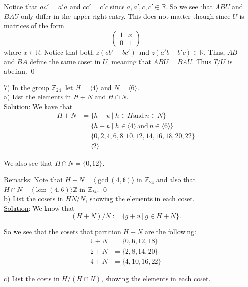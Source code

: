 \documentclass{article}
\DeclareMathOperator{\lcm}{lcm}
\begin{document}
Notice that $aa' = a'a$ and $cc' = c'c$ since $a, a', c, c' \in \mathbb{R}$. So we see that $ABU$ and $BAU$ only differ in the upper right entry. This does not matter though since $U$ is matrices of the form 
$$\begin{pmatrix}
1 & x \\
0 & 1
\end{pmatrix}$$ where $x \in \mathbb{R}$. Notice that both $z(ab' + bc')$ and $z(a'b + b'c) \in \mathbb{R}$. Thus, $AB$ and $BA$ define the same coset in $U$, meaning that $ABU = BAU$. Thus $T/U$ is abelian. \qed \pagebreak

7) In the group $\mathbb{Z}_{24}$, let $H = \langle 4 \rangle$ and $N = \langle 6 \rangle.$\\

a) List the elements in $H + N$ and $H \cap N$.\\

\underline{Solution}: We have that
\begin{align*}
	H+N &= \{ h + n \ \vert \ h \in H \text{and} \, n \in N\} \\
	&= \{ h + n \ \vert \ h \in \langle 4 \rangle \, \text{and} \, n \in \langle 6 \rangle\} \\
	&= \{ 0, 2, 4, 6, 8, 10, 12, 14, 16, 18, 20, 22 \} \\
	&= \langle 2 \rangle
\end{align*}

We also see that $H \cap N = \{ 0, 12 \}.$

Remarks: Note that $H + N = \big\langle \gcd(4,6) \big\rangle $ in $\mathbb{Z}_{24}$ and also that $H \cap N = \big\langle \lcm(4, 6) \big\rangle \mathbb{Z}$ in $\mathbb{Z}_{24}$. \qed \\

b) List the cosets in $HN/N$, showing the elements in each coset.\\

\underline{Solution}: We know that 
$$ (H + N) / N := \{ g + n \, \vert \, g \in H + N\}. $$

So we see that the cosets that partition $H+N$ are the following:
\begin{align*}
	0 + N &= \{ 0, 6, 12, 18\} \\
	2 + N &= \{ 2, 8, 14, 20 \} \\
	4 + N &= \{ 4, 10, 16, 22\}
\end{align*}

c) List the costs in $H/(H \cap N)$, showing the elements in each coset.\\
\end{document}
